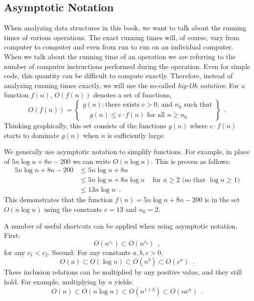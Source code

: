 \subsection{Asymptotic Notation}

   When analyzing data structures in this book, we want to talk about the running times of various operations.  The exact running times will, of course, vary from computer to computer and even from run to run on an individual computer.  When we talk about the running time of an operation we are referring to the number of computer instructions performed during the operation.  Even for simple code, this quantity can be difficult to compute exactly.  Therefore, instead of analyzing running times exactly, we will use the so-called \emph{big-Oh notation}: For a function $f(n)$, $O(f(n))$ denotes a set of functions,
\[
   O(f(n)) = \left\{
     \begin{array}{l}
       g(n):\mbox{there exists $c>0$, and $n_0$ such that} \\
             \quad\mbox{$g(n) \le c\cdot f(n)$ for all $n\ge n_0$}   
     \end{array} \right\} \enspace .
\]
Thinking graphically, this set consists of the functions $g(n)$ where $c\cdot f(n)$ starts to dominate $g(n)$ when $n$ is sufficiently large.

We generally use asymptotic notation to simplify functions.  For example, in place of $5n\log n + 8n - 200$ we can write $O(n\log n)$.
This is proven as follows:
\begin{align*} 
       5n\log n + 8n - 200
        & \le 5n\log n + 8n \\
        & \le 5n\log n + 8n\log n & \mbox{ for $n\ge 2$ (so that $\log n \ge 1$)}
            \\
        & \le 13n\log n  \enspace .
\end{align*}
This demonstrates that the function $f(n)=5n\log n + 8n - 200$ is in the set $O(n\log n)$ using the constants $c=13$ and $n_0 = 2$.

A number of useful shortcuts can be applied when using asymptotic notation.  First:
\[ O(n^{c_1}) \subset O(n^{c_2}) \enspace ,\]
for any $c_1 < c_2$.  Second: For any constants $a,b,c > 0$,
\[ O(a) \subset O(\log n) \subset O(n^{b}) \subset O({c}^n) \enspace . \]
These inclusion relations can be multiplied by any positive value, and they still hold. For example, multiplying by $n$ yields:
\[ O(n) \subset O(n\log n) \subset O(n^{1+b}) \subset O(n{c}^n) \enspace . \]


